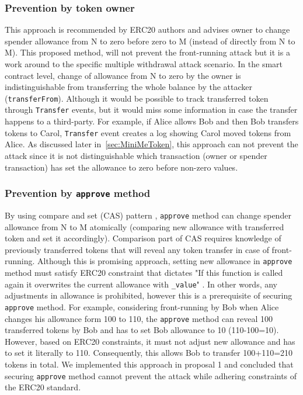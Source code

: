 \subsubsection*{Prevention by token owner} This approach is recommended by ERC20 authors \cite{Ref08} and advises owner to change spender allowance from N to zero before zero to M (instead of directly from N to M). This proposed method, will not prevent the front-running attack but it is a work around to the specific multiple withdrawal attack scenario. In the smart contract level, change of allowance from N to zero by the owner is indistinguishable from transferring the whole balance by the attacker (\texttt{transferFrom}).
\newline Although it would be possible to track transferred token through \texttt{Transfer} events, but it would miss some information in case the transfer happens to a third-party. For example, if Alice allows Bob and then Bob transfers tokens to Carol, \texttt{Transfer} event creates a log showing Carol moved tokens from Alice. As discussed later in~\ref{sec:MiniMeToken}, this approach can not prevent the attack since it is not distinguishable which transaction (\ie owner or spender transaction) has set the allowance to zero before non-zero values.

	
\subsubsection*{Prevention by \texttt{approve} method} By using compare and set (CAS) pattern \cite{Ref06}, \texttt{approve} method can change spender allowance from N to M atomically (\ie comparing new allowance with transferred token and set it accordingly). Comparison part of CAS requires knowledge of previously transferred tokens that will reveal any token transfer in case of front-running. Although this is promising approach,  setting new allowance in \texttt{approve} method must satisfy ERC20 constraint that dictates "If this function is called again it overwrites the current allowance with \texttt{\_value}" \cite{Ref08}. In other words, any adjustments in allowance is prohibited, however this is a prerequisite of securing \texttt{approve} method. 
For example, considering front-running by Bob when Alice changes his allowance form 100 to 110, the \texttt{approve} method can reveal 100 transferred tokens by Bob and has to set Bob allowance to 10 (110-100=10). However, based on ERC20 constraints, it must not adjust new allowance and has to set it literally to 110. Consequently, this allows Bob to transfer 100+110=210 tokens in total. We implemented this approach in proposal 1 and concluded that securing \texttt{approve} method cannot prevent the attack while adhering constraints of the ERC20 standard.
	
